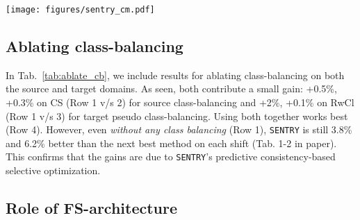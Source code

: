 \documentclass[10pt,twocolumn,letterpaper]{article}
\newcommand{\method}{\texttt{SENTRY}\xspace}
\begin{document}
\begin{figure*}[b]
    \centering
    \texttt{[image: figures/sentry\_cm.pdf]}
    \caption{
    SVHNMNIST-LT (IF=20): Performance on target test set after \method.
    }
    \label{fig:sentry_cm}
 \end{figure*}

\subsection{Ablating class-balancing} 



 
 
In Tab.~\ref{tab:ablate_cb}, we include results for ablating class-balancing on both the source and target domains. As seen, both contribute a small gain: +0.5\%, +0.3\% on CS (Row 1 v/s 2) for source class-balancing and +2\%, +0.1\% on RwCl (Row 1 v/s 3) for target pseudo class-balancing. Using both together works best (Row 4). However, even \emph{without any class balancing} (Row 1), \method is still 3.8\% and 6.2\% better than the next best method on each shift (Tab. 1-2 in paper). This confirms that the gains are due to \method's predictive consistency-based selective optimization.

\begin{table}[t]
    \begin{center} 
    \caption{Ablating class balancing. Gray row=\method. CB=class balancing. subscript=improvement v/s row 1.}
  
    \label{tab:ablate_cb}   
    \end{center}
    \vspace{-15pt}
 \end{table}

\subsection{Role of FS-architecture} 
 
\end{document}
